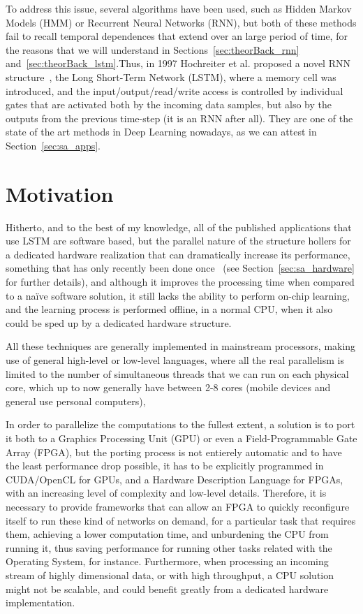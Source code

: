 To address this issue, several algorithms have been used, such as Hidden Markov Models (HMM) or Recurrent Neural Networks (RNN), but both of these methods fail to recall temporal dependences that extend over an large period of time, for the reasons that we will understand in Sections~\ref{sec:theorBack_rnn} and~\ref{sec:theorBack_lstm}.Thus, in 1997 Hochreiter et al. proposed a novel RNN structure~\cite{Hoch97}, the Long Short-Term Network (LSTM), where a memory cell was introduced, and the input/output/read/write access is controlled by individual gates that are activated both by the incoming data samples, but also by the outputs from the previous time-step (it is an RNN after all). They are one of the state of the art methods in Deep Learning nowadays, as we can attest in Section~\ref{sec:sa_apps}.

\section{Motivation}\label{sec:intro_mot}
Hitherto, and to the best of my knowledge, all of the published applications that use LSTM are software based, but the parallel nature of the structure hollers for a dedicated hardware realization that can dramatically increase its performance, something that  has only recently been done once~\cite{Chang15} (see Section~\ref{sec:sa_hardware} for further details), and although it improves the processing time when compared to a naïve software solution, it still lacks the ability to perform on-chip learning, and the learning process is performed offline, in a normal CPU, when it also could be sped up by a dedicated hardware structure.

All these techniques are generally implemented in mainstream processors, making use of general high-level or low-level languages, where all the real parallelism is limited to the number of simultaneous threads that we can run on each physical core, which up to now generally have between 2-8 cores (mobile devices and general use personal computers), 

In order to parallelize the computations to the fullest extent, a solution is to port it both to a Graphics Processing Unit (GPU) or even a Field-Programmable Gate Array (FPGA), but the porting process is not entierely automatic and to have the least performance drop possible, it has to be explicitly programmed in CUDA/OpenCL for GPUs, and a Hardware Description Language for FPGAs, with an increasing level of complexity and low-level details. Therefore, it is necessary to provide frameworks that can allow an FPGA to quickly reconfigure itself to run these kind of networks on demand, for a particular task that requires them, achieving a lower computation time, and unburdening the CPU from running it, thus saving performance for running other tasks related with the Operating System, for instance. Furthermore, when processing an incoming stream of highly dimensional data, or with high throughput, a CPU solution might not be scalable, and could benefit greatly from a dedicated hardware implementation.

